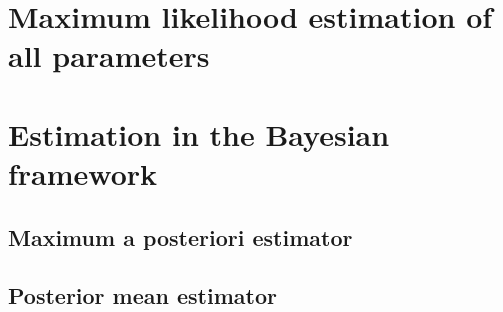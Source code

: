 \section{Maximum likelihood estimation of all parameters}


\section{Estimation in the Bayesian framework}

\subsection{Maximum a posteriori estimator}

\subsection{Posterior mean estimator}


